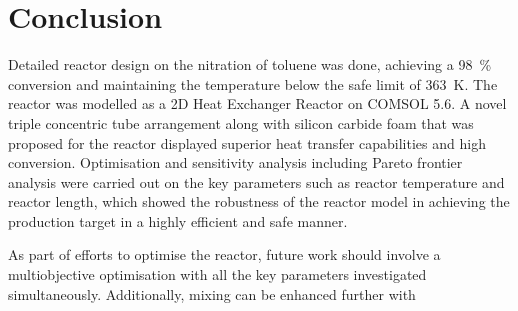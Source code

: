 \section{Conclusion} \label{sec:conclusion}
Detailed reactor design on the nitration of toluene was done, achieving a \SI{98}{\%} conversion and maintaining the temperature below the safe limit of \SI{363}{\K}. The reactor was modelled as a 2D Heat Exchanger Reactor on COMSOL 5.6. A novel triple concentric tube arrangement along with silicon carbide foam that was proposed for the reactor displayed superior heat transfer capabilities and high conversion. Optimisation and sensitivity analysis including Pareto frontier analysis were carried out on the key parameters such as reactor temperature and reactor length, which showed the robustness of the reactor model in achieving the production target in a highly efficient and safe manner.  

As part of efforts to optimise the reactor, future work should involve a multiobjective optimisation with all the key parameters investigated simultaneously. Additionally, mixing can be enhanced further with 


